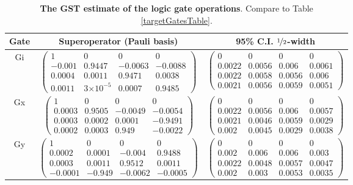 \documentclass{article}[11pt]
\providecommand{\e}[1]{\ensuremath{\times 10^{#1}}}
\begin{document}
\begin{table}[h]
\begin{center}
\begin{tabular}[l]{|c|c|c|}
\hline
Gate & Superoperator (Pauli basis) & 95\% C.I. $\nicefrac{1}{2}$-width \\ \hline
Gi & $ \left(\!\!\begin{array}{cccc}
1 & 0 & 0 & 0 \\ 
-0.001 & 0.9447 & -0.0063 & -0.0088 \\ 
0.0004 & 0.0011 & 0.9471 & 0.0038 \\ 
0.0011 & 3\e{-5} & 0.0007 & 0.9485
 \end{array}\!\!\right) $
 & $ \left(\!\!\begin{array}{cccc}
0 & 0 & 0 & 0 \\ 
0.0022 & 0.0056 & 0.006 & 0.0061 \\ 
0.0022 & 0.0058 & 0.0056 & 0.006 \\ 
0.0021 & 0.0056 & 0.0059 & 0.0051
 \end{array}\!\!\right) $
 \\ \hline
Gx & $ \left(\!\!\begin{array}{cccc}
1 & 0 & 0 & 0 \\ 
0.0003 & 0.9505 & -0.0049 & -0.0054 \\ 
0.0003 & 0.0002 & 0.0001 & -0.9491 \\ 
0.0002 & 0.0003 & 0.949 & -0.0022
 \end{array}\!\!\right) $
 & $ \left(\!\!\begin{array}{cccc}
0 & 0 & 0 & 0 \\ 
0.0022 & 0.0056 & 0.006 & 0.0057 \\ 
0.0021 & 0.0046 & 0.0059 & 0.0029 \\ 
0.002 & 0.0045 & 0.0029 & 0.0038
 \end{array}\!\!\right) $
 \\ \hline
Gy & $ \left(\!\!\begin{array}{cccc}
1 & 0 & 0 & 0 \\ 
0.0002 & 0.0001 & -0.004 & 0.9488 \\ 
0.0003 & 0.0011 & 0.9512 & 0.0011 \\ 
-0.0001 & -0.949 & -0.0062 & -0.0005
 \end{array}\!\!\right) $
 & $ \left(\!\!\begin{array}{cccc}
0 & 0 & 0 & 0 \\ 
0.002 & 0.006 & 0.006 & 0.003 \\ 
0.0022 & 0.0048 & 0.0057 & 0.0047 \\ 
0.002 & 0.003 & 0.0053 & 0.0035
 \end{array}\!\!\right) $
 \\ \hline
\end{tabular}

\caption{\textbf{The GST estimate of the logic gate operations}.  Compare to Table \ref{targetGatesTable}.\label{bestGatesetGatesTable}}
\end{center}
\end{table}
\end{document}
